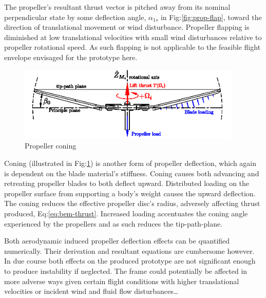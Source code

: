 \par
The propeller's resultant thrust vector is pitched away from its nominal perpendicular state by some deflection angle, $\alpha_{1s}$ in Fig:\ref{fig:prop-flap}, toward the direction of translational movement or wind disturbance. Propeller flapping is diminished at low translational velocities with small wind disturbances relative to propeller rotational speed. As such flapping is not applicable to the feasible flight envelope envisaged for the prototype here.
\par
\begin{figure}[hbtp]
\centering
\includegraphics[width=0.95\textwidth]{figs/prop-coning}
\caption{Propeller coning}
\label{fig:prop-coning}
\end{figure}
Coning (illustrated in Fig:\ref{fig:prop-coning}) is another form of propeller deflection, which again is dependent on the blade material's stiffness. Coning causes both advancing and retreating propeller blades to both deflect upward. Distributed loading on the propeller surface from supporting a body's weight causes the upward deflection. The coning reduces the effective propeller disc's radius, adversely affecting thrust produced, Eq:\ref{eq:bem-thrust}. Increased loading accentuates the coning angle experienced by the propellers and as such reduces the tip-path-plane.
\par
Both aerodynamic induced propeller deflection effects can be quantified numerically. Their derivation and resultant equations are cumbersome however. In due course both effects on the produced prototype are not significant enough to produce instability if neglected. The frame could potentially be affected in more adverse ways given certain flight conditions with higher translational velocities or incident wind and fluid flow disturbances\ldots
